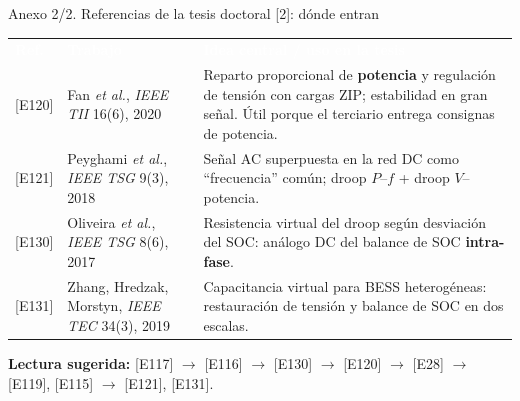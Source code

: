 \documentclass[aspectratio=169,10pt,t]{beamer}
\newcommand{\thead}{\rowcolor{usachO}}
\newcommand{\Th}[1]{\textcolor{white}{\textbf{#1}}}
\begin{document}
\begin{frame}{Anexo 2/2. Referencias de la tesis doctoral [2]: dónde entran}
  \scriptsize\renewcommand{\arraystretch}{1.15}
  \begin{tabularx}{\textwidth}{@{}p{0.95cm}p{3.6cm}X@{}}
    \thead \Th{Ref.} & \Th{Trabajo} & \Th{Idea central / uso en la tesis} \\
    {[E120]} & Fan \emph{et al.}, \emph{IEEE TII} 16(6), 2020 & Reparto proporcional de \textbf{potencia} y regulación de tensión con cargas ZIP; estabilidad en gran señal. Útil porque el terciario entrega consignas de potencia. \\
    {[E121]} & Peyghami \emph{et al.}, \emph{IEEE TSG} 9(3), 2018 & Señal AC superpuesta en la red DC como ``frecuencia'' común; droop $P$--$f$ + droop $V$--potencia. \\
    {[E130]} & Oliveira \emph{et al.}, \emph{IEEE TSG} 8(6), 2017 & Resistencia virtual del droop según desviación del SOC: análogo DC del balance de SOC \textbf{intra-fase}. \\
    {[E131]} & Zhang, Hredzak, Morstyn, \emph{IEEE TEC} 34(3), 2019 & Capacitancia virtual para BESS heterogéneas: restauración de tensión y balance de SOC en dos escalas. \\
  \end{tabularx}

  \vspace{6pt}
  \footnotesize\textbf{Lectura sugerida:} [E117] $\to$ [E116] $\to$ [E130] $\to$ [E120] $\to$ [E28] $\to$ [E119], [E115] $\to$ [E121], [E131].
\end{frame}
\end{document}
